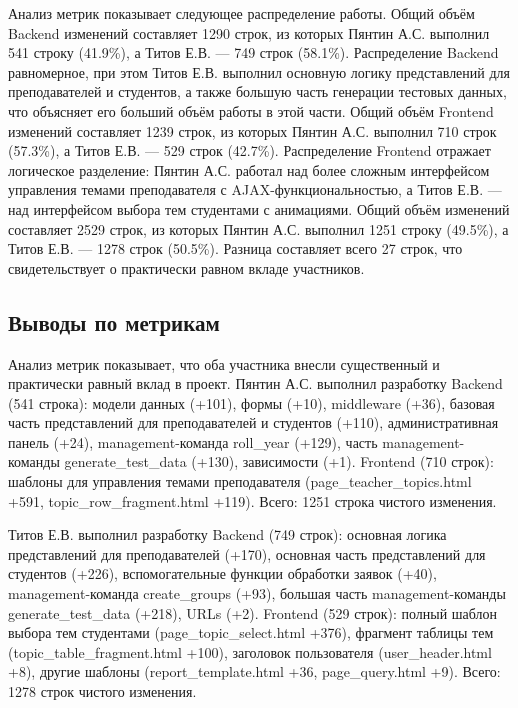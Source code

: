 \documentclass[a4paper,12pt]{article}
\begin{document}
Анализ метрик показывает следующее распределение работы. Общий объём Backend изменений составляет 1290 строк, из которых Пянтин А.С. выполнил 541 строку (41.9\%), а Титов Е.В. — 749 строк (58.1\%). Распределение Backend равномерное, при этом Титов Е.В. выполнил основную логику представлений для преподавателей и студентов, а также большую часть генерации тестовых данных, что объясняет его больший объём работы в этой части. Общий объём Frontend изменений составляет 1239 строк, из которых Пянтин А.С. выполнил 710 строк (57.3\%), а Титов Е.В. — 529 строк (42.7\%). Распределение Frontend отражает логическое разделение: Пянтин А.С. работал над более сложным интерфейсом управления темами преподавателя с AJAX-функциональностью, а Титов Е.В. — над интерфейсом выбора тем студентами с анимациями. Общий объём изменений составляет 2529 строк, из которых Пянтин А.С. выполнил 1251 строку (49.5\%), а Титов Е.В. — 1278 строк (50.5\%). Разница составляет всего 27 строк, что свидетельствует о практически равном вкладе участников.

\subsection{Выводы по метрикам}

Анализ метрик показывает, что оба участника внесли существенный и практически равный вклад в проект. Пянтин А.С. выполнил разработку Backend (541 строка): модели данных (+101), формы (+10), middleware (+36), базовая часть представлений для преподавателей и студентов (+110), административная панель (+24), management-команда roll\_year (+129), часть management-команды generate\_test\_data (+130), зависимости (+1). Frontend (710 строк): шаблоны для управления темами преподавателя (page\_teacher\_topics.html +591, topic\_row\_fragment.html +119). Всего: 1251 строка чистого изменения.

Титов Е.В. выполнил разработку Backend (749 строк): основная логика представлений для преподавателей (+170), основная часть представлений для студентов (+226), вспомогательные функции обработки заявок (+40), management-команда create\_groups (+93), большая часть management-команды generate\_test\_data (+218), URLs (+2). Frontend (529 строк): полный шаблон выбора тем студентами (page\_topic\_select.html +376), фрагмент таблицы тем (topic\_table\_fragment.html +100), заголовок пользователя (user\_header.html +8), другие шаблоны (report\_template.html +36, page\_query.html +9). Всего: 1278 строк чистого изменения.
\end{document}
